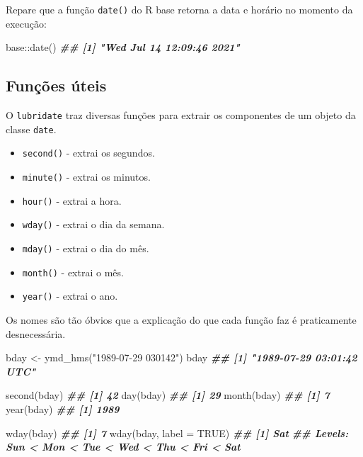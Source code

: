 \documentclass[
]{book}
\newenvironment{Shaded}{\begin{snugshade}}{\end{snugshade}}
\newcommand{\AttributeTok}[1]{\textcolor[rgb]{0.77,0.63,0.00}{#1}}
\newcommand{\ConstantTok}[1]{\textcolor[rgb]{0.00,0.00,0.00}{#1}}
\newcommand{\DocumentationTok}[1]{\textcolor[rgb]{0.56,0.35,0.01}{\textbf{\textit{#1}}}}
\newcommand{\FunctionTok}[1]{\textcolor[rgb]{0.00,0.00,0.00}{#1}}
\newcommand{\NormalTok}[1]{#1}
\newcommand{\OtherTok}[1]{\textcolor[rgb]{0.56,0.35,0.01}{#1}}
\newcommand{\SpecialCharTok}[1]{\textcolor[rgb]{0.00,0.00,0.00}{#1}}
\newcommand{\StringTok}[1]{\textcolor[rgb]{0.31,0.60,0.02}{#1}}
\providecommand{\tightlist}{%
  \setlength{\itemsep}{0pt}\setlength{\parskip}{0pt}}
\begin{document}
Repare que a função \texttt{date()} do R base retorna a data e horário no momento da execução:

\begin{Shaded}
\begin{Highlighting}[]
\NormalTok{base}\SpecialCharTok{::}\FunctionTok{date}\NormalTok{()}
\DocumentationTok{\#\# [1] "Wed Jul 14 12:09:46 2021"}
\end{Highlighting}
\end{Shaded}

\hypertarget{funuxe7uxf5es-uxfateis}{%
\subsection{Funções úteis}\label{funuxe7uxf5es-uxfateis}}

O \texttt{lubridate} traz diversas funções para extrair os componentes de um objeto da classe \texttt{date}.

\begin{itemize}
\tightlist
\item
  \texttt{second()} - extrai os segundos.
\item
  \texttt{minute()} - extrai os minutos.
\item
  \texttt{hour()} - extrai a hora.
\item
  \texttt{wday()} - extrai o dia da semana.
\item
  \texttt{mday()} - extrai o dia do mês.
\item
  \texttt{month()} - extrai o mês.
\item
  \texttt{year()} - extrai o ano.
\end{itemize}

Os nomes são tão óbvios que a explicação do que cada função faz é praticamente desnecessária.

\begin{Shaded}
\begin{Highlighting}[]
\NormalTok{bday }\OtherTok{\textless{}{-}} \FunctionTok{ymd\_hms}\NormalTok{(}\StringTok{"1989{-}07{-}29 030142"}\NormalTok{)}
\NormalTok{bday}
\DocumentationTok{\#\# [1] "1989{-}07{-}29 03:01:42 UTC"}

\FunctionTok{second}\NormalTok{(bday)}
\DocumentationTok{\#\# [1] 42}
\FunctionTok{day}\NormalTok{(bday)}
\DocumentationTok{\#\# [1] 29}
\FunctionTok{month}\NormalTok{(bday)}
\DocumentationTok{\#\# [1] 7}
\FunctionTok{year}\NormalTok{(bday)}
\DocumentationTok{\#\# [1] 1989}

\FunctionTok{wday}\NormalTok{(bday)}
\DocumentationTok{\#\# [1] 7}
\FunctionTok{wday}\NormalTok{(bday, }\AttributeTok{label =} \ConstantTok{TRUE}\NormalTok{)}
\DocumentationTok{\#\# [1] Sat}
\DocumentationTok{\#\# Levels: Sun \textless{} Mon \textless{} Tue \textless{} Wed \textless{} Thu \textless{} Fri \textless{} Sat}
\end{Highlighting}
\end{Shaded}
\end{document}
